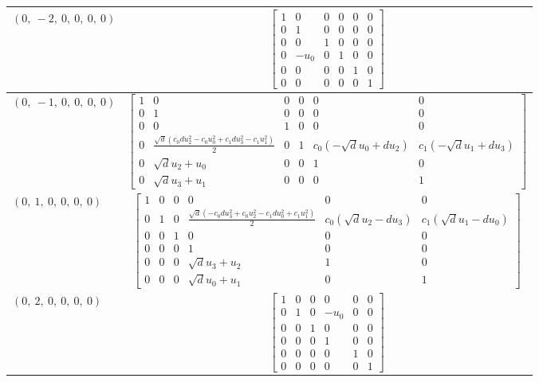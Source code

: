\documentclass[11pt]{article}
\theoremstyle{definition}
\begin{document}
\begin{longtable}{|l|c|}
    \hline
    $\left( 0, \  -2, \  0, \  0, \  0, \  0\right)$ & ${\left[\begin{matrix}1 & 0 & 0 & 0 & 0 & 0\\0 & 1 & 0 & 0 & 0 & 0\\0 & 0 & 1 & 0 & 0 & 0\\0 & - u_{0} & 0 & 1 & 0 & 0\\0 & 0 & 0 & 0 & 1 & 0\\0 & 0 & 0 & 0 & 0 & 1\end{matrix}\right]}$ \\
    \hline
    $\left( 0, \  -1, \  0, \  0, \  0, \  0\right)$ & ${\left[\begin{matrix}1 & 0 & 0 & 0 & 0 & 0\\0 & 1 & 0 & 0 & 0 & 0\\0 & 0 & 1 & 0 & 0 & 0\\0 & \frac{\sqrt{d} \left(c_{0} d u_{2}^{2} - c_{0} u_{0}^{2} + c_{1} d u_{3}^{2} - c_{1} u_{1}^{2}\right)}{2} & 0 & 1 & c_{0} \left(- \sqrt{d} u_{0} + d u_{2}\right) & c_{1} \left(- \sqrt{d} u_{1} + d u_{3}\right)\\0 & \sqrt{d} u_{2} + u_{0} & 0 & 0 & 1 & 0\\0 & \sqrt{d} u_{3} + u_{1} & 0 & 0 & 0 & 1\end{matrix}\right]}$ \\
    \hline
    $\left( 0, \  1, \  0, \  0, \  0, \  0\right)$ & ${\left[\begin{matrix}1 & 0 & 0 & 0 & 0 & 0\\0 & 1 & 0 & \frac{\sqrt{d} \left(- c_{0} d u_{3}^{2} + c_{0} u_{2}^{2} - c_{1} d u_{0}^{2} + c_{1} u_{1}^{2}\right)}{2} & c_{0} \left(\sqrt{d} u_{2} - d u_{3}\right) & c_{1} \left(\sqrt{d} u_{1} - d u_{0}\right)\\0 & 0 & 1 & 0 & 0 & 0\\0 & 0 & 0 & 1 & 0 & 0\\0 & 0 & 0 & \sqrt{d} u_{3} + u_{2} & 1 & 0\\0 & 0 & 0 & \sqrt{d} u_{0} + u_{1} & 0 & 1\end{matrix}\right]}$ \\
    \hline
    $\left( 0, \  2, \  0, \  0, \  0, \  0\right)$ & ${\left[\begin{matrix}1 & 0 & 0 & 0 & 0 & 0\\0 & 1 & 0 & - u_{0} & 0 & 0\\0 & 0 & 1 & 0 & 0 & 0\\0 & 0 & 0 & 1 & 0 & 0\\0 & 0 & 0 & 0 & 1 & 0\\0 & 0 & 0 & 0 & 0 & 1\end{matrix}\right]}$ \\

\end{longtable}
\end{document}
